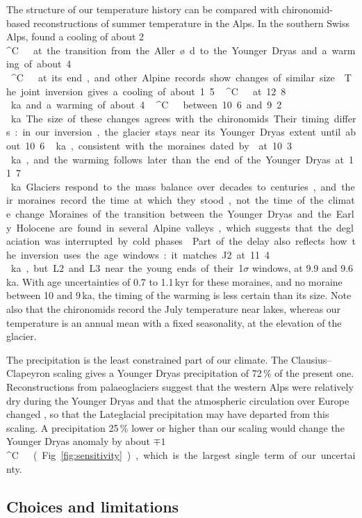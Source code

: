 \documentclass[tc, manuscript]{copernicus}
\newcommand{\degC}{\unit{^{\circ}C}}
\begin{document}
The structure of our temperature history can be compared with chironomid-based reconstructions of summer temperature in the Alps. In the southern Swiss Alps, \citet{samartin2012jqs} found a cooling of about 2\,\degC\ at the transition from the Aller\o d to the Younger Dryas and a warming of about 4\,\degC\ at its end, and other Alpine records show changes of similar size \citep{ilyashuk2009,heiri2014,heiri2015}. The joint inversion gives a cooling of about 1.5\,\degC\ at 12.8\,ka and a warming of about 4\,\degC\ between 10.6 and 9.2\,ka. The size of these changes agrees with the chironomids. Their timing differs: in our inversion, the glacier stays near its Younger Dryas extent until about 10.6\,ka, consistent with the moraines dated by \citet{protin2019} at 10.3\,ka, and the warming follows later than the end of the Younger Dryas at 11.7\,ka. Glaciers respond to the mass balance over decades to centuries, and their moraines record the time at which they stood, not the time of the climate change. Moraines of the transition between the Younger Dryas and the Early Holocene are found in several Alpine valleys, which suggests that the deglaciation was interrupted by cold phases \citep{schindelwig2012,moran2016,boxleitner2019,protin2021}. Part of the delay also reflects how the inversion uses the age windows: it matches J2 at 11.4\,ka, but L2 and L3 near the young ends of their 1$\sigma$ windows, at 9.9 and 9.6\,ka. With age uncertainties of 0.7 to 1.1\,kyr for these moraines, and no moraine between 10 and 9\,ka, the timing of the warming is less certain than its size. Note also that the chironomids record the July temperature near lakes, whereas our temperature is an annual mean with a fixed seasonality, at the elevation of the glacier.

The precipitation is the least constrained part of our climate. The Clausius--Clapeyron scaling gives a Younger Dryas precipitation of 72\,\% of the present one. Reconstructions from palaeoglaciers suggest that the western Alps were relatively dry during the Younger Dryas \citep{baroni2021} and that the atmospheric circulation over Europe changed \citep{rea2020}, so that the Lateglacial precipitation may have departed from this scaling. A precipitation 25\,\% lower or higher than our scaling would change the Younger Dryas anomaly by about $\mp1$\,\degC\ (Fig.~\ref{fig:sensitivity}), which is the largest single term of our uncertainty.

\subsection{Choices and limitations}
\label{sec:limitations}
\end{document}
